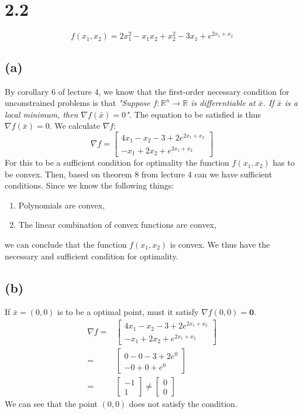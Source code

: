\documentclass{article}
\begin{document}
\section*{2.2}
	\begin{equation}
		f(x_1,x_2) = 2x^2_1 -x_1x_2+x_2^2 -3x_1 + e^{2x_1+x_2}
	\end{equation}
\subsection*{(a)}
	By corollary 6 of lecture 4, we know that the first-order necessary condition for unconstrained problems is that \textit{"Suppose $f : \mathbb{R}^n \rightarrow \mathbb{R}$ is differentiable at $\bar{x}$. If $\bar{x}$ is a local minimum, then $\nabla f(\bar{x}) = 0$".}	The equation to be satisfied is thus $\nabla f(\bar{x}) = 0$. We calculate $\nabla f$:
	\begin{equation}
		\nabla f =
			\begin{bmatrix}
			4x_1-x_2-3+ 2 e^{2 x_1 + x_2} \\
			-x_1+2x_2 + e^{2x_1+x_2}
			\end{bmatrix}
	\end{equation}
	For this to be a sufficient condition for optimality the function $f(x_1,x_2)$ has to be convex. Then, based on theorem 8 from lecture 4 can we have sufficient conditions. Since we know the following things:
	\begin{enumerate}
		\item Polynomials are convex,
		\item The linear combination of convex functions are convex,
	\end{enumerate}
	we can conclude that the function $f(x_1,x_2)$ is convex. We thus have the necessary and sufficient condition for optimality.
\subsection*{(b)}
	If $\bar{x}=(0,0)$ is to be a optimal point, must it satisfy $\nabla f(0,0) = \boldsymbol{0}$. 
	\begin{align}
		\nabla f =&
			\begin{bmatrix}
				4x_1-x_2-3+ 2 e^{2 x_1 + x_2} \\
				-x_1+2x_2 + e^{2x_1+x_2}
			\end{bmatrix} \\
		=& \begin{bmatrix}
				0-0-3+ 2 e^{0} \\
				-0+0 + e^{0}
			\end{bmatrix}\\
		=& \begin{bmatrix}
				-1 \\
				1
		\end{bmatrix} \neq
		\begin{bmatrix}
			0 \\
			0
		\end{bmatrix}
	\end{align}
	We can see that the point $(0,0)$ does not satisfy the condition.
	
\end{document}
